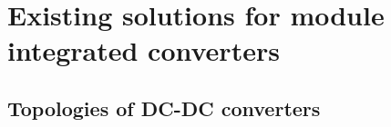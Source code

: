 \chapter{Existing solutions for module integrated converters}\label{background}



\section{Topologies of DC-DC converters}\label{DC_DC_Converters}





